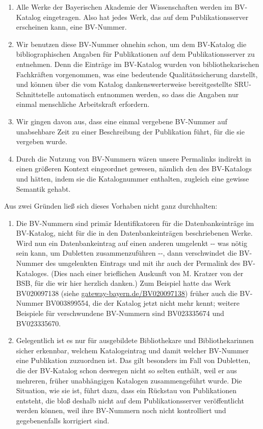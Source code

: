 \documentclass[12pt, a4paper]{article}
\begin{document}
\begin{enumerate}
\item Alle Werke der Bayerischen Akademie der Wissenschaften werden im
  BV-Katalog eingetragen. Also hat jedes Werk, das auf dem
  Publikationsserver erscheinen kann, eine BV-Nummer.

\item Wir benutzen diese BV-Nummer ohnehin schon, um dem BV-Katalog
  die bibliographischen Angaben für Publikationen auf dem
  Publikationsserver zu entnehmen. Denn die Einträge im BV-Katalog
  wurden von bibliothekarischen Fachkräften vorgenommen, was eine
  bedeutende Qualitätssicherung darstellt, und können über die vom
  Katalog dankenswerterweise bereitgestellte SRU-Schnittstelle
  automatisch entnommen werden, so dass die Angaben nur einmal
  menschliche Arbeitskraft erfordern.

\item Wir gingen davon aus, dass eine einmal vergebene BV-Nummer auf
  unabsehbare Zeit zu einer Beschreibung der Publikation führt, für
  die sie vergeben wurde.

\item Durch die Nutzung von BV-Nummern wären unsere Permalinks
  indirekt in einen größeren Kontext eingeordnet gewesen, nämlich den
  des BV-Katalogs und hätten, indem sie die Katalognummer enthalten,
  zugleich eine gewisse Semantik gehabt.
\end{enumerate}

Aus zwei Gründen ließ sich dieses Vorhaben nicht ganz durchhalten:

\begin{enumerate}
\item Die BV-Nummern sind primär Identifikatoren für die
  Datenbankeinträge im BV-Katalog, nicht für die in den
  Datenbankeinträgen beschriebenen Werke. Wird nun ein
  Datenbankeintrag auf einen anderen umgelenkt -\/- was nötig sein
  kann, um Dubletten zusammenzuführen -\/-, dann verschwindet die
  BV-Nummer des umgelenkten Eintrags und mit ihr auch der Permalink
  des BV-Kataloges. (Dies nach einer brieflichen Auskunft von M.
  Kratzer von der BSB, für die wir hier herzlich danken.) Zum Beispiel
  hatte das Werk BV020097138 (siehe
  \href{http://gateway-bayern.de/BV020097138}{gateway-bayern.de/\-BV020097138})
  früher auch die BV-Nummer BV003899554, die der Katalog jetzt nicht
  mehr kennt; weitere Beispiele für verschwundene BV-Nummern sind
  BV023335674 und BV023335670.

\item Gelegentlich ist es nur für ausgebildete Bibliothekare und
  Bibliothekarinnen sicher erkennbar, welchem Katalogeintrag und damit
  welcher BV-Nummer eine Publikation zuzuordnen ist. Das gilt
  besonders im Fall von Dubletten, die der BV-Katalog schon deswegen
  nicht so selten enthält, weil er aus mehreren, früher unabhängigen
  Katalogen zusammengeführt wurde. Die Situation, wie sie ist, führt
  dazu, dass ein Rückstau von Publikationen entsteht, die bloß deshalb
  nicht auf dem Publikationsserver veröffentlicht werden können, weil
  ihre BV-Nummern noch nicht kontrolliert und gegebenenfalls
  korrigiert sind.
\end{enumerate}
\end{document}
